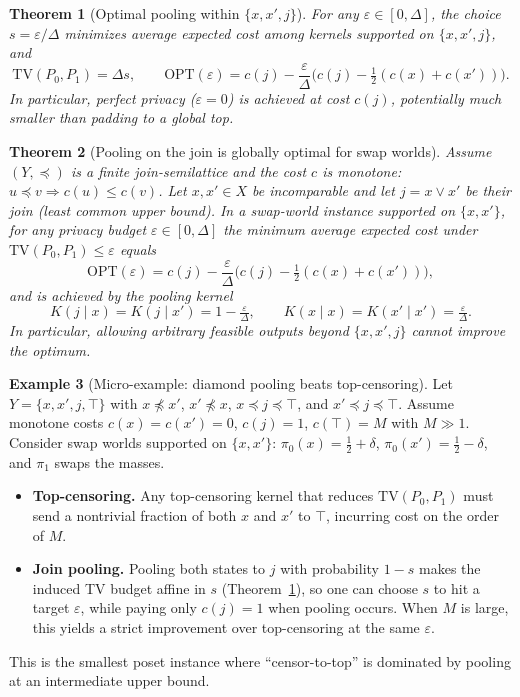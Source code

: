 \documentclass[11pt]{article}
\newtheorem{theorem}{Theorem}
\theoremstyle{definition}
\newtheorem{example}[theorem]{Example}
\theoremstyle{remark}
\newcommand{\TV}{\mathrm{TV}}
\begin{document}
\begin{theorem}[Optimal pooling within $\{x,x',j\}$]\label{thm:pooling}
For any $\varepsilon\in[0,\Delta]$, the choice $s=\varepsilon/\Delta$ minimizes average expected cost among kernels supported on $\{x,x',j\}$, and
\[
\TV(P_0,P_1)=\Delta s,\qquad
\mathrm{OPT}(\varepsilon)=c(j)-\frac{\varepsilon}{\Delta}\Big(c(j)-\tfrac12(c(x)+c(x'))\Big).
\]
In particular, perfect privacy ($\varepsilon=0$) is achieved at cost $c(j)$, potentially much smaller than padding to a global top.
\end{theorem}

\begin{theorem}[Pooling on the join is globally optimal for swap worlds]\label{thm:joinglobal}
Assume $(Y,\preceq)$ is a finite \emph{join-semilattice} and the cost $c$ is monotone: $u\preceq v\Rightarrow c(u)\le c(v)$.
Let $x,x'\in X$ be incomparable and let $j=x\vee x'$ be their join (least common upper bound).
In a swap-world instance supported on $\{x,x'\}$, for any privacy budget $\varepsilon\in[0,\Delta]$ the minimum average expected cost under
$\TV(P_0,P_1)\le \varepsilon$ equals
\[
\mathrm{OPT}(\varepsilon)=c(j)-\frac{\varepsilon}{\Delta}\Big(c(j)-\tfrac12(c(x)+c(x'))\Big),
\]
and is achieved by the pooling kernel
\[
K(j\mid x)=K(j\mid x')=1-\tfrac{\varepsilon}{\Delta},\qquad K(x\mid x)=K(x'\mid x')=\tfrac{\varepsilon}{\Delta}.
\]
In particular, allowing arbitrary feasible outputs beyond $\{x,x',j\}$ cannot improve the optimum.
\end{theorem}

\begin{example}[Micro-example: diamond pooling beats top-censoring]
Let $Y=\{x,x',j,\top\}$ with $x\not\preceq x'$, $x'\not\preceq x$, $x\preceq j\preceq \top$, and $x'\preceq j\preceq \top$.
Assume monotone costs $c(x)=c(x')=0$, $c(j)=1$, $c(\top)=M$ with $M\gg 1$.
Consider swap worlds supported on $\{x,x'\}$: $\pi_0(x)=\tfrac12+\delta$, $\pi_0(x')=\tfrac12-\delta$, and $\pi_1$ swaps the masses.
\begin{itemize}[leftmargin=*]
\item \textbf{Top-censoring.} Any top-censoring kernel that reduces $\TV(P_0,P_1)$ must send a nontrivial fraction of both $x$ and $x'$ to $\top$, incurring cost on the order of $M$.
\item \textbf{Join pooling.} Pooling both states to $j$ with probability $1-s$ makes the induced TV budget affine in $s$ (Theorem~\ref{thm:pooling}), so one can choose $s$ to hit a target $\varepsilon$, while paying only $c(j)=1$ when pooling occurs.
When $M$ is large, this yields a strict improvement over top-censoring at the same $\varepsilon$.
\end{itemize}
This is the smallest poset instance where ``censor-to-top'' is dominated by pooling at an intermediate upper bound.
\end{example}
\end{document}
